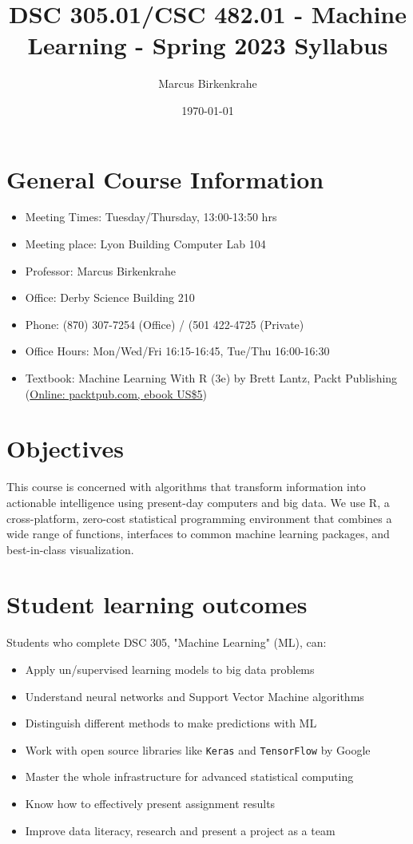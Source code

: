\documentclass[11pt]{article}
\author{Marcus Birkenkrahe}
\date{\today}
\title{DSC 305.01/CSC 482.01 - Machine Learning - Spring 2023 Syllabus}
\begin{document}
\maketitle
\section{General Course Information}
\label{sec:org3f7e090}

\begin{itemize}
\item Meeting Times: Tuesday/Thursday, 13:00-13:50 hrs
\item Meeting place: Lyon Building Computer Lab 104
\item Professor: Marcus Birkenkrahe
\item Office: Derby Science Building 210
\item Phone: (870) 307-7254 (Office) / (501 422-4725 (Private)
\item Office Hours: Mon/Wed/Fri 16:15-16:45, Tue/Thu 16:00-16:30
\item Textbook: Machine Learning With R (3e) by Brett Lantz, Packt
Publishing (\href{https://www.packtpub.com/product/machine-learning-with-r-third-edition/9781788295864}{Online: packtpub.com, ebook US\$5})
\end{itemize}

\section{Objectives}
\label{sec:orgadb89f3}

This course is concerned with algorithms that transform information
into actionable intelligence using present-day computers and big
data. We use R, a cross-platform, zero-cost statistical programming
environment that combines a wide range of functions, interfaces to
common machine learning packages, and best-in-class visualization.

\section{Student learning outcomes}
\label{sec:org29694a9}

Students who complete DSC 305, "Machine Learning" (ML), can:

\begin{itemize}
\item Apply un/supervised learning models to big data problems
\item Understand neural networks and Support Vector Machine algorithms
\item Distinguish different methods to make predictions with ML
\item Work with open source libraries like \texttt{Keras} and \texttt{TensorFlow} by Google
\item Master the whole infrastructure for advanced statistical computing
\item Know how to effectively present assignment results
\item Improve data literacy, research and present a project as a team
\end{itemize}
\end{document}
